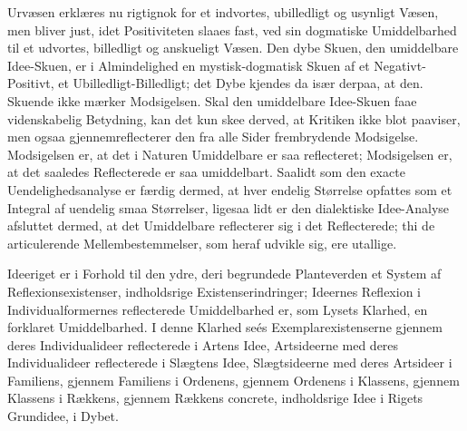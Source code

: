 \documentclass[12pt,a4paper]{book}
\begin{document}
Urvæsen erklæres nu rigtignok for et indvortes, ubilledligt og usynligt Væsen,
men bliver just, idet Positiviteten slaaes fast, ved sin dogmatiske
Umiddelbarhed til et udvortes, billedligt og anskueligt Væsen. Den dybe Skuen,
den umiddelbare Idee-Skuen, er i Almindelighed en mystisk-dogmatisk Skuen af et
Negativt-Positivt, et Ubilledligt-Billedligt; det Dybe kjendes da især derpaa,
at den. Skuende ikke mærker Modsigelsen.
Skal den umiddelbare Idee-Skuen faae videnskabelig Betydning, kan det kun skee
derved, at Kritiken ikke blot paaviser, men ogsaa gjennemreflecterer den fra
alle Sider frembrydende Modsigelse. Modsigelsen er, at det i Naturen
Umiddelbare er saa reflecteret; Modsigelsen er, at det saaledes Reflecterede er
saa umiddelbart. Saalidt som den exacte Uendelighedsanalyse er færdig dermed,
at hver endelig Størrelse opfattes som et Integral af uendelig smaa Størrelser,
ligesaa lidt er den dialektiske Idee-Analyse afsluttet dermed, at det
Umiddelbare reflecterer sig i det Reflecterede; thi de articulerende
Mellembestemmelser, som heraf udvikle sig, ere utallige.

Ideeriget er i Forhold til den ydre, deri begrundede Planteverden et System af
Reflexionsexistenser, indholdsrige Existenserindringer; Ideernes Reflexion i
Individualformernes reflecterede Umiddelbarhed er, som Lysets Klarhed, en
forklaret Umiddelbarhed. I denne Klarhed seés Exemplarexistenserne gjennem
deres Individualideer reflecterede i Artens Idee, Artsideerne med deres
Individualideer reflecterede i Slægtens Idee, Slægtsideerne med deres Artsideer
i Familiens, gjennem Familiens i Ordenens, gjennem Ordenens i Klassens, gjennem
Klassens i Rækkens, gjennem Rækkens concrete, indholdsrige Idee i Rigets
Grundidee, i Dybet.

\end{document}
